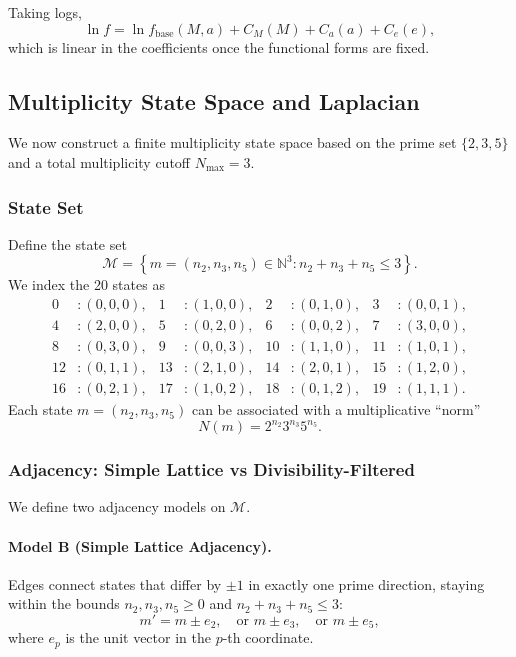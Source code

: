 \documentclass[11pt]{article}
\begin{document}
Taking logs,
\begin{equation}
  \ln f = \ln f_{\text{base}}(M,a) + C_M(M) + C_a(a) + C_e(e),
  \label{eq:logf}
\end{equation}
which is linear in the coefficients once the functional forms are fixed.

\subsection{Multiplicity State Space and Laplacian}

We now construct a finite multiplicity state space based on the prime set $\{2,3,5\}$ and a total multiplicity cutoff $N_{\max}=3$.

\subsubsection{State Set}

Define the state set
\[
  \mathcal{M} = \left\{ m = (n_2,n_3,n_5) \in \mathbb{N}^3 : n_2+n_3+n_5 \le 3 \right\}.
\]
We index the 20 states as
\begin{align*}
0 &: (0,0,0), &
1 &: (1,0,0), &
2 &: (0,1,0), &
3 &: (0,0,1), \\
4 &: (2,0,0), &
5 &: (0,2,0), &
6 &: (0,0,2), &
7 &: (3,0,0), \\
8 &: (0,3,0), &
9 &: (0,0,3), &
10 &: (1,1,0), &
11 &: (1,0,1), \\
12 &: (0,1,1), &
13 &: (2,1,0), &
14 &: (2,0,1), &
15 &: (1,2,0), \\
16 &: (0,2,1), &
17 &: (1,0,2), &
18 &: (0,1,2), &
19 &: (1,1,1).
\end{align*}
Each state $m=(n_2,n_3,n_5)$ can be associated with a multiplicative ``norm''
\[
  N(m) = 2^{n_2}3^{n_3}5^{n_5}.
\]

\subsubsection{Adjacency: Simple Lattice vs Divisibility-Filtered}

We define two adjacency models on $\mathcal{M}$.

\paragraph{Model B (Simple Lattice Adjacency).}

Edges connect states that differ by $\pm 1$ in exactly one prime direction, staying within the bounds $n_2,n_3,n_5 \ge 0$ and $n_2+n_3+n_5 \le 3$:
\[
  m' = m \pm e_{2},\quad \text{or } m\pm e_{3},\quad \text{or } m\pm e_{5},
\]
where $e_p$ is the unit vector in the $p$-th coordinate.
\end{document}
